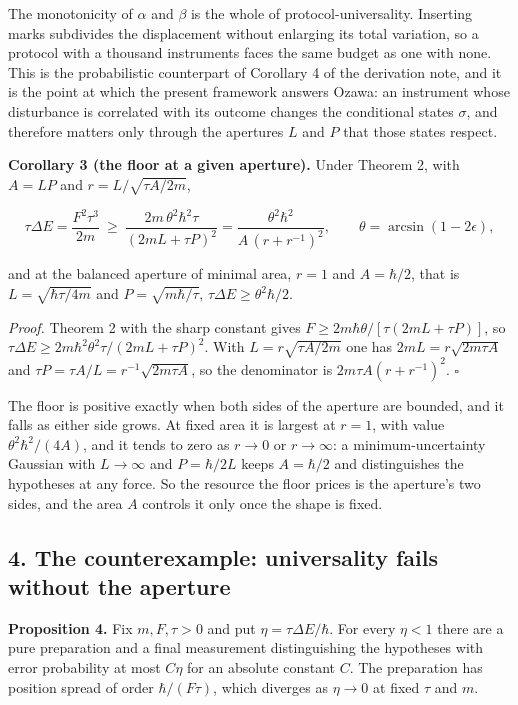 \documentclass[11pt,a4paper]{article}
\begin{document}
The monotonicity of \(\alpha\) and \(\beta\) is the whole of
protocol-universality. Inserting marks subdivides the displacement
without enlarging its total variation, so a protocol with a thousand
instruments faces the same budget as one with none. This is the
probabilistic counterpart of Corollary 4 of the derivation note, and it
is the point at which the present framework answers Ozawa: an instrument
whose disturbance is correlated with its outcome changes the conditional
states \(\sigma\), and therefore matters only through the apertures
\(L\) and \(P\) that those states respect.

\textbf{Corollary 3 (the floor at a given aperture).} Under Theorem 2,
with \(A=LP\) and \(r=L/\sqrt{\tau A/2m}\),

\[\tau\Delta E=\frac{F^2\tau^3}{2m}\ \ge\ \frac{2m\,\theta^2\hbar^2\tau}{(2mL+\tau P)^2}
=\frac{\theta^2\hbar^2}{A\,(r+r^{-1})^2},\qquad\theta=\arcsin(1-2\epsilon),\]

and at the balanced aperture of minimal area, \(r=1\) and \(A=\hbar/2\),
that is \(L=\sqrt{\hbar\tau/4m}\) and \(P=\sqrt{m\hbar/\tau}\),
\(\tau\Delta E\ge\theta^2\hbar/2\).

\emph{Proof.} Theorem 2 with the sharp constant gives
\(F\ge2m\hbar\theta/[\tau(2mL+\tau P)]\), so
\(\tau\Delta E\ge2m\hbar^2\theta^2\tau/(2mL+\tau P)^2\). With
\(L=r\sqrt{\tau A/2m}\) one has \(2mL=r\sqrt{2m\tau A}\) and
\(\tau P=\tau A/L=r^{-1}\sqrt{2m\tau A}\), so the denominator is
\(2m\tau A(r+r^{-1})^2\). \(\square\)

The floor is positive exactly when both sides of the aperture are
bounded, and it falls as either side grows. At fixed area it is largest
at \(r=1\), with value \(\theta^2\hbar^2/(4A)\), and it tends to zero as
\(r\to0\) or \(r\to\infty\): a minimum-uncertainty Gaussian with
\(L\to\infty\) and \(P=\hbar/2L\) keeps \(A=\hbar/2\) and distinguishes
the hypotheses at any force. So the resource the floor prices is the
aperture's two sides, and the area \(A\) controls it only once the shape
is fixed.

\hypertarget{the-counterexample-universality-fails-without-the-aperture}{%
\subsection{4. The counterexample: universality fails without the
aperture}\label{the-counterexample-universality-fails-without-the-aperture}}

\textbf{Proposition 4.} Fix \(m,F,\tau>0\) and put
\(\eta=\tau\Delta E/\hbar\). For every \(\eta<1\) there are a pure
preparation and a final measurement distinguishing the hypotheses with
error probability at most \(C\eta\) for an absolute constant \(C\). The
preparation has position spread of order \(\hbar/(F\tau)\), which
diverges as \(\eta\to0\) at fixed \(\tau\) and \(m\).
\end{document}

